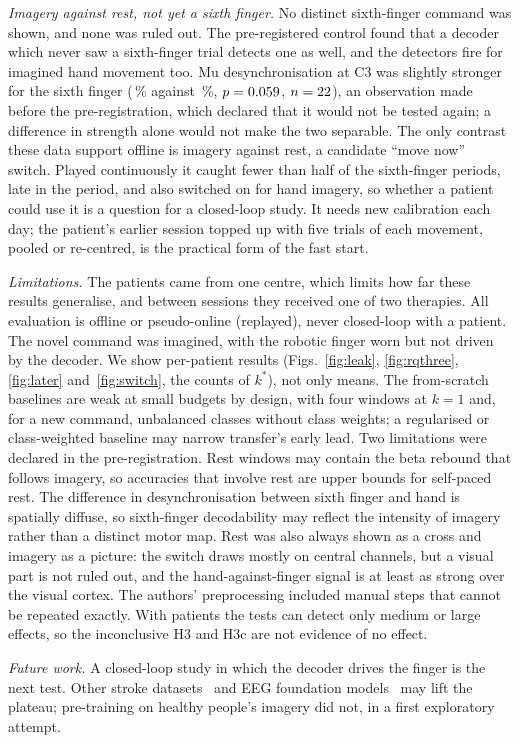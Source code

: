 \emph{Imagery against rest, not yet a sixth finger.} No distinct sixth-finger
command was shown, and none was ruled out. The pre-registered control found
that a decoder which never saw a sixth-finger trial detects one as well, and
the detectors fire for imagined hand movement too. Mu desynchronisation at C3
was slightly stronger for the sixth finger (\edaErdMuCThreeSfMean\,\% against
\edaErdMuCThreeAhMean\,\%, $p = 0.059$,
$n = 22$), an observation made before the pre-registration,
which declared that it would not be tested again; a difference in strength
alone would not make the two separable. The only contrast these data support
offline is imagery against rest, a candidate ``move now'' switch. Played
continuously it caught fewer than half of the sixth-finger periods, late in
the period, and also switched on for hand imagery, so whether a patient could use
it is a question for a closed-loop study. It needs new calibration each day;
the patient's earlier session topped up with five trials of each movement,
pooled or re-centred, is the practical form of the fast start.

\emph{Limitations.} The \nSubjects{} patients came from one centre, which
limits how far these results generalise, and between sessions they received
one of two therapies. All evaluation is offline or pseudo-online (replayed),
never closed-loop with a patient. The novel command was imagined, with the
robotic finger worn but not driven by the decoder. We show per-patient
results (Figs.~\ref{fig:leak}, \ref{fig:rqthree}, \ref{fig:later}
and~\ref{fig:switch}, the counts of $k^*$), not only means. The from-scratch
baselines are weak at small budgets by design, with four windows at $k = 1$
and, for a new command, unbalanced classes without class weights; a
regularised or class-weighted baseline may narrow transfer's early lead. Two
limitations were declared in the pre-registration. Rest windows may
contain the beta rebound that follows imagery, so accuracies that involve
rest are upper bounds for self-paced rest. The difference in
desynchronisation between sixth finger and hand is spatially diffuse, so
sixth-finger decodability may reflect the intensity of imagery rather than a
distinct motor map. Rest was also always shown as a cross and imagery as a
picture: the switch draws mostly on central channels, but a visual part is
not ruled out, and the hand-against-finger signal is at least as strong over
the visual cortex. The authors' preprocessing included manual steps that
cannot be repeated exactly. With \nPre{} patients the tests can detect only
medium or large effects, so the inconclusive H3 and H3c are not evidence of
no effect.

\emph{Future work.} A closed-loop study in which the decoder drives the
finger is the next test. Other stroke datasets~\cite{liu2024acute,lu2026chronic}
and EEG foundation models~\cite{jiang2024labram,wang2025cbramod} may lift the
plateau; pre-training on healthy people's imagery did not, in a first
exploratory attempt.
